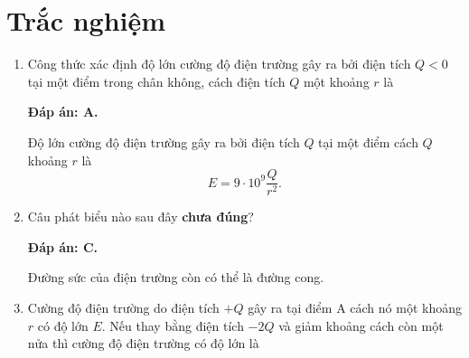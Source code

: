 \whiteBGstarBegin
\setcounter{section}{0}
\section{Trắc nghiệm}
\begin{enumerate}[label=\bfseries Câu \arabic*:]
	
	
	\item {}
	
	\cauhoi
	{Công thức xác định độ lớn cường độ điện trường gây ra bởi điện tích $Q<0$ tại một điểm trong chân không, cách điện tích $Q$ một khoảng $r$ là
		
	}
	\loigiai
	{	\textbf{Đáp án: A.}
		
		Độ lớn cường độ điện trường gây ra bởi điện tích $Q$ tại một điểm cách $Q$ khoảng $r$ là
		$$E=9\cdot10^9 \dfrac{Q}{r^2}.$$
	}
	\item {}
	
	\cauhoi
	{Câu phát biểu nào sau đây \textbf{chưa đúng}?
		
	}
	\loigiai
	{	\textbf{Đáp án: C.}
		
		Đường sức của điện trường còn có thể là đường cong.
	}
	\item {}
	
	\cauhoi
	{Cường độ điện trường do điện tích $+Q$ gây ra tại điểm A cách nó một khoảng $r$ có độ lớn $E$. Nếu thay bằng điện tích $-2Q$ và giảm khoảng cách còn một nửa thì cường độ điện trường có độ lớn là
		
}
\end{enumerate}
